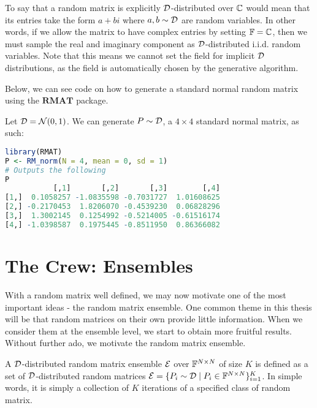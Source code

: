 \begin{remark}
To say that a random matrix is explicitly $\mathcal{D}$-distributed over $\mathbb{C}$ would mean that its entries take the form $a + bi$ where $a,b \sim \mathcal{D}$ are random variables.
In other words, if we allow the matrix to have complex entries by setting $\mathbb{F} = \mathbb{C}$, then we must sample the real and imaginary component as $\mathcal{D}$-distributed i.i.d. random variables.
Note that this means we cannot set the field for implicit $\mathcal{D}$ distributions, as the field is automatically chosen by the generative algorithm.
\end{remark}

\medskip
 Below, we can see code on how to generate a standard normal random matrix using the $\textbf{RMAT}$ package.
\begin{code}
Let $\mathcal{D} = \mathcal{N}(0,1)$. We can generate $P \sim \mathcal{D}$, a $4 \times 4$ standard normal matrix, as such:
\end{code}

\begin{lstlisting}[language=R]
library(RMAT)
P <- RM_norm(N = 4, mean = 0, sd = 1)
# Outputs the following
P
           [,1]       [,2]       [,3]        [,4]
[1,]  0.1058257 -1.0835598 -0.7031727  1.01608625
[2,] -0.2170453  1.8206070 -0.4539230  0.06828296
[3,]  1.3002145  0.1254992 -0.5214005 -0.61516174
[4,] -1.0398587  0.1975445 -0.8511950  0.86366082
\end{lstlisting}


\newpage


\section{The Crew: Ensembles}

With a random matrix well defined, we may now motivate one of the most important ideas - the random matrix ensemble. One common theme in this thesis will be that random matrices on their own provide little information. When we consider them at the ensemble level, we start to obtain more fruitful results. Without further ado, we motivate the random matrix ensemble.

\begin{definition}
A $\mathcal{D}$-distributed random matrix ensemble $\mathcal{E}$ over $\mathbb{F}^{N \times N}$ of size $K$ is defined as a set of $\mathcal{D}$-distributed random matrices $\mathcal{E} = \{P_i \sim \mathcal{D} \mid P_i \in \mathbb{F}^{N \times N}\}_{i = 1}^K$. In simple words, it is simply a collection of $K$ iterations of a specified class of random matrix.
\end{definition}

